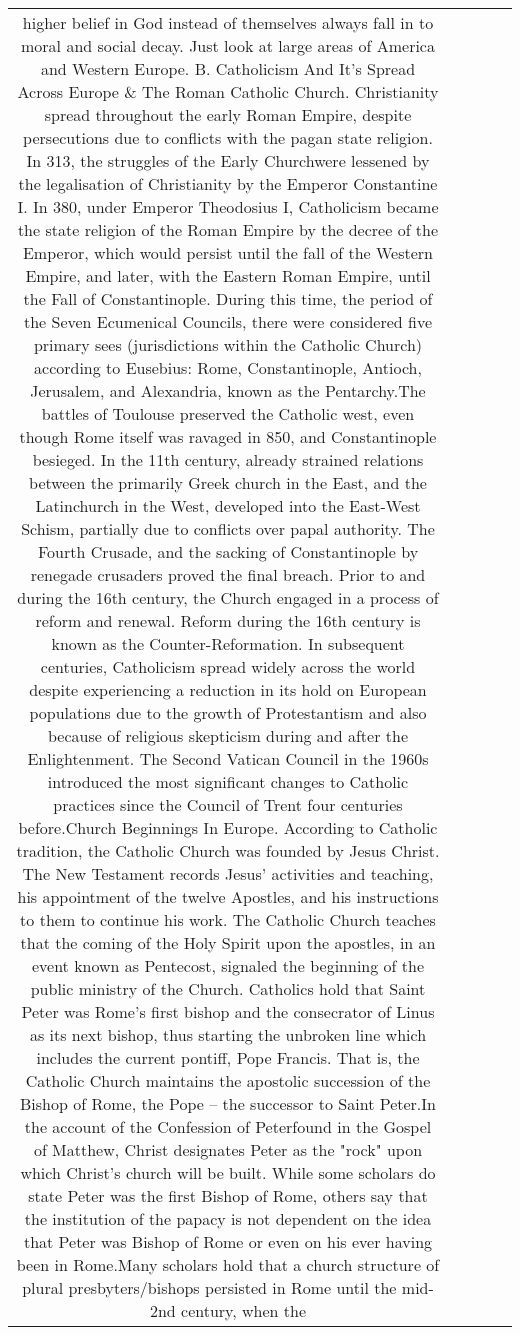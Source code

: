 \documentclass[11pt]{article}
\newlength\mylength
\begin{document}
\begin{center}
\begin{longtable}{|C{.65\mylength}|C{.30\mylength}|C{.12\mylength}|C{.12\mylength}|C{.12\mylength}|}
higher belief in God instead of themselves always fall in to moral and social decay. Just look at large areas of America and Western Europe. B.  Catholicism And It's Spread Across Europe \& The Roman Catholic Church. Christianity spread throughout the early Roman Empire, despite persecutions due to conflicts with the pagan state religion. In 313, the struggles of the Early Churchwere lessened by the legalisation of Christianity by the Emperor Constantine I. In 380, under Emperor Theodosius I, Catholicism became the state religion of the Roman Empire by the decree of the Emperor, which would persist until the fall of the Western Empire, and later, with the Eastern Roman Empire, until the Fall of Constantinople. During this time, the period of the Seven Ecumenical Councils, there were considered five primary sees (jurisdictions within the Catholic Church) according to Eusebius: Rome, Constantinople, Antioch, Jerusalem, and Alexandria, known as the Pentarchy.The battles of Toulouse preserved the Catholic west, even though Rome itself was ravaged in 850, and Constantinople besieged. In the 11th century, already strained relations between the primarily Greek church in the East, and the Latinchurch in the West, developed into the East-West Schism, partially due to conflicts over papal authority. The Fourth Crusade, and the sacking of Constantinople by renegade crusaders proved the final breach. Prior to and during the 16th century, the Church engaged in a process of reform and renewal. Reform during the 16th century is known as the Counter-Reformation.  In subsequent centuries, Catholicism spread widely across the world despite experiencing a reduction in its hold on European populations due to the growth of Protestantism and also because of religious skepticism during and after the Enlightenment. The Second Vatican Council in the 1960s introduced the most significant changes to Catholic practices since the Council of Trent four centuries before.Church Beginnings In Europe. According to Catholic tradition, the Catholic Church was founded by Jesus Christ.  The New Testament records Jesus' activities and teaching, his appointment of the twelve Apostles, and his instructions to them to continue his work.  The Catholic Church teaches that the coming of the Holy Spirit upon the apostles, in an event known as Pentecost, signaled the beginning of the public ministry of the Church. Catholics hold that Saint Peter was Rome's first bishop and the consecrator of Linus as its next bishop, thus starting the unbroken line which includes the current pontiff, Pope Francis. That is, the Catholic Church maintains the apostolic succession of the Bishop of Rome, the Pope – the successor to Saint Peter.In the account of the Confession of Peterfound in the Gospel of Matthew, Christ designates Peter as the "rock" upon which Christ's church will be built. While some scholars do state Peter was the first Bishop of Rome, others say that the institution of the papacy is not dependent on the idea that Peter was Bishop of Rome or even on his ever having been in Rome.Many scholars hold that a church structure of plural presbyters/bishops persisted in Rome until the mid-2nd century, when the 
\end{longtable}
\end{center}
\end{document}
